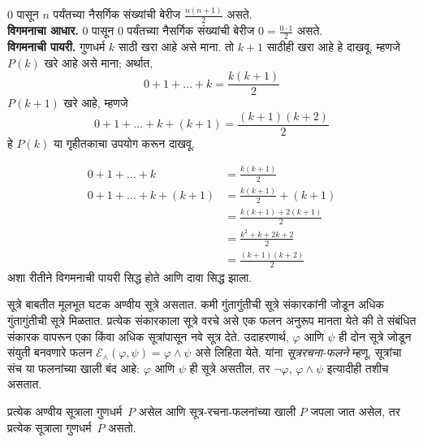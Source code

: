 \begin{ex} 0 पासून $n$ पर्यंतच्या नैसर्गिक
संख्यांची बेरीज $\frac{n(n+1)}{2}$ असते. \\

\textbf{विगमनाचा आधार.} 0 पासून 0 पर्यंतच्या नैसर्गिक
संख्यांची बेरीज $0=
\frac{0\cdot 1}{2}$ असते.\\

\textbf{विगमनाची पायरी.} गुणधर्म $k$ साठी खरा आहे असे
माना. तो $k+1$ साठीही खरा आहे हे दाखवू. म्हणजे $P(k)$
खरे आहे असे माना; अर्थात,
\[ 0 + 1 + \ldots + k = \frac{k(k+1)}{2} \]
$P(k+1)$ खरे आहे, म्हणजे
\[ 0 + 1 + \ldots + k + (k+1) = \frac{(k+1)(k+2)}{2} \]
हे $P(k)$ या गृहीतकाचा उपयोग करून दाखवू.

\begin{align*}
0 + 1 + \ldots + k &= \frac{k(k+1)}{2} \tag{गृहीतक} \\
0 + 1 + \ldots + k + (k+1) &= \frac{k(k+1)}{2} + (k+1)
\tag{दोन्ही बाजूंना $k+1$ मिळवा} \\
&= \frac{k(k+1) + 2(k+1)}{2} \\
&= \frac{k^2 + k + 2k +2}{2} \\
&=\frac{(k+1)(k+2)}{2}
\end{align*}
अशा रीतीने विगमनाची पायरी सिद्ध होते आणि दावा सिद्ध झाला.
\end{ex}

\begin{explain}
सूत्रे बाबतीत मूलभूत घटक अण्वीय सूत्रे असतात.
कमी गुंतागुंतीची सूत्रे संकारकांनी जोडून अधिक गुंतागुंतीची
सूत्रे मिळतात. प्रत्येक संकारकाला सूत्रे वरचे
असे एक फलन अनुरूप मानता येते की ते संबंधित संकारक वापरून
एका किंवा अधिक सूत्रांपासून नवे सूत्र देते. उदाहरणार्थ,
$\varphi$ आणि $\psi$ ही दोन सूत्रे जोडून संयुती
बनवणारे फलन $\mathcal E _\land (\varphi,
\psi) = \varphi \land \psi$ असे लिहिता येते. यांना
\emph{सूत्ररचना-फलने} म्हणू. सूत्रांचा संच या
फलनांच्या खाली बंद आहे: $\varphi$ आणि $\psi$ ही
सूत्रे असतील, तर $\lnot \varphi$,
$\varphi \land
\psi$ इत्यादीही तशीच असतात.
\end{explain}

\begin{defn}[सूत्रे वरील विगमन]
प्रत्येक अण्वीय सूत्राला गुणधर्म~$P$ असेल आणि
सूत्र-रचना-फलनांच्या खाली $P$ जपला जात असेल, तर प्रत्येक
सूत्राला गुणधर्म~$P$ असतो.
\end{defn}

